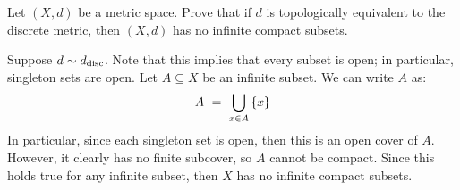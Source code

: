 \documentclass{article}
\begin{document}
\setcounter{subsection}{6}
\setcounter{exr}{30}

\begin{exr}
    Let $ (X, d) $ be a metric space.
    Prove that if $ d $ is topologically equivalent to the discrete metric,
    then $ (X, d) $ has no infinite compact subsets.
\end{exr}

\begin{pf}
    Suppose $ d \sim d_{\textrm{disc}} $.
    Note that this implies that every subset is open; in particular, singleton sets are open. \vsp
    Let $ A \subseteq X $ be an infinite subset.
    We can write $ A $ as:
    \begin{equation*}
        A \ = \ \bigcup_{x \in A} \left\{{x}\right\}
    \end{equation*}
    In particular, since each singleton set is open, then this is an open cover of $ A $.
    However, it clearly has no finite subcover, so $ A $ cannot be compact. \vsp
    Since this holds true for any infinite subset, then $ X $ has no infinite compact subsets.
\end{pf}
\end{document}
